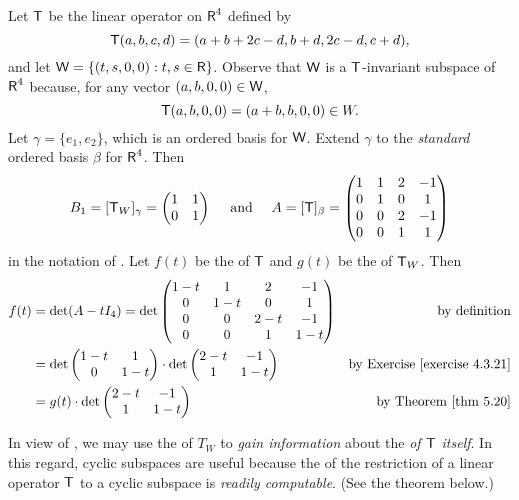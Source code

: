 \begin{example} \label{example 5.4.5}
Let \(\textsf{T}\) be the linear operator on \(\textsf{R}^4\) defined by
\[
    \textsf{T}(a, b, c, d) = (a + b + 2c - d, b + d, 2c - d, c + d),
\]
and let \(\textsf{W} = \{ (t, s, 0, 0) : t, s \in \textsf{R} \}\).
Observe that \(\textsf{W}\) is a \(\textsf{T}\)-invariant subspace of \(\textsf{R}^4\) because, for any vector \((a, b, 0, 0) \in \textsf{W}\),
\[
    \textsf{T}(a, b, 0, 0) = (a + b, b, 0, 0) \in W.
\]
Let \(\gamma = \{ e_1, e_2 \}\), which is an ordered basis for \(\textsf{W}\).
Extend \(\gamma\) to the \emph{standard} ordered basis \(\beta\) for \(\textsf{R}^4\).
Then
\[
    B_1 = [\textsf{T}_W]_{\gamma} = \begin{pmatrix} 1 & 1 \\ 0 & 1 \end{pmatrix}
    \quad \text{ and } \quad
    A = [\textsf{T}]_{\beta} = \begin{pmatrix} 1 & 1 & 2 & -1 \\ 0 & 1 & 0 & 1 \\ 0 & 0 & 2 & -1 \\ 0 & 0 & 1 & 1 \end{pmatrix}
\]
in the notation of .
Let \(f(t)\) be the \CPOLY{} of \(\textsf{T}\) and \(g(t)\) be the \CPOLY{} of \(\textsf{T}_W\).
Then
\begin{align*}
    f(t) & = \det(A - tI_4) = \det \begin{pmatrix} 1-t & 1 & 2 & -1 \\ 0 & 1-t & 0 & 1 \\ 0 & 0 & 2-t & -1 \\ 0 & 0 & 1 & 1-t \end{pmatrix} & \text{by definition} \\
         & = \det \begin{pmatrix} 1-t & 1 \\ 0 & 1-t \end{pmatrix} \cdot \det \begin{pmatrix} 2-t & -1 \\ 1 & 1-t \end{pmatrix} & \text{by \EXEC{4.3.21}} \\
         & = g(t) \cdot \det \begin{pmatrix} 2-t & -1 \\ 1 & 1-t \end{pmatrix} & \text{by \THM{5.20}}
\end{align*}
\end{example}

\begin{remark} \label{remark 5.4.3}
In view of , we may use the \CPOLY{} of \(T_W\) to \emph{gain information} about the \CPOLY{} \emph{of \(\textsf{T}\) itself}.
In this regard, cyclic subspaces are useful because the \CPOLY{} of the restriction of a linear operator \(\textsf{T}\) to a cyclic subspace is \emph{readily computable}.
(See the theorem below.)
\end{remark}

